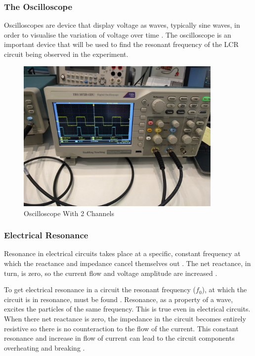 \documentclass[12pt]{article}
\begin{document}
\subsubsection{The Oscilloscope} \label{sec:1.2.1}

Oscilloscopes are device that display voltage as waves, typically sine waves, in order to visualise the variation of voltage over time
\cite{flukeoscillo,keyoscillo}.
The oscilloscope is an important device that will be used to find the resonant frequency of the LCR circuit being observed in the experiment.

\begin{figure}[H]
    \centering
    \includegraphics[width=10cm]{oscillo.jpg}
    \caption{\centering \footnotesize{Oscilloscope With 2 Channels \protect\cite{oscillopic}}}
\end{figure}

\subsubsection{Electrical Resonance} \label{sec:1.2.2}

Resonance in electrical circuits takes place at a specific, constant frequency at which the reactance and impedance cancel themselves out
\cite{geekresonance}.
The net reactance, in turn, is zero, so the current flow and voltage amplitude are increased
\cite{geekresonance}.

To get electrical resonance in a circuit the resonant frequency ($f_0$), at which the circuit is in resonance, must be found
\cite{geekresonance,eeresonance}.
Resonance, as a property of a wave, excites the particles of the same frequency. This is true even in electrical circuits.
When there net reactance is zero, the impedance in the circuit becomes entirely resistive so there is no counteraction to the flow of the current.
This constant resonance and increase in flow of current can lead to the circuit components overheating and breaking
\cite{geekresonance}.
\end{document}
